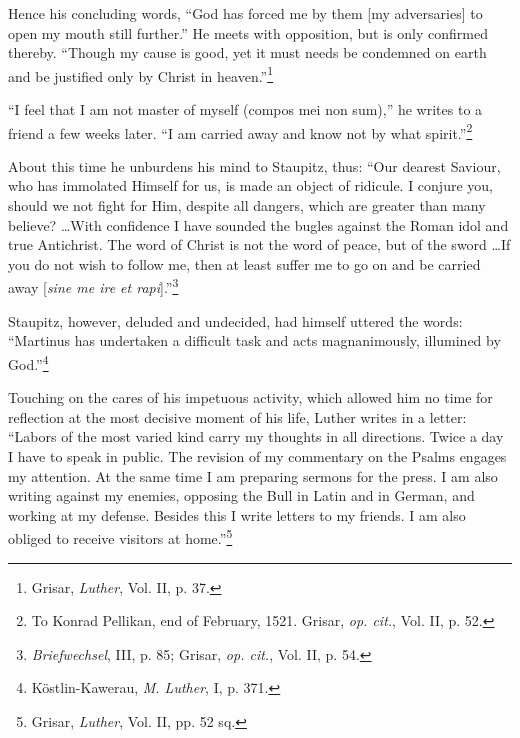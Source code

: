 Hence his concluding words, “God has forced me by them [my adversaries]
to open my mouth still further.” He meets with opposition, but is
only confirmed thereby. “Though my cause is good, yet it must needs be
condemned on earth and be justified only by Christ in heaven.”\footnote
{Grisar, \textit{Luther}, Vol. II, p. 37.}

“I feel that I am not master of myself (compos mei non sum),” he
writes to a friend a few weeks later. “I am carried away and know not by
what spirit.”\footnote
{To Konrad Pellikan, end of February, 1521. Grisar, \textit{op. cit.}, Vol. II, p. 52.}

About this time he unburdens his mind to Staupitz, thus: “Our dearest
Saviour, who has immolated Himself for us, is made an object of ridicule.
I conjure you, should we not fight for Him, despite all dangers, which are
greater than many believe? \dots With confidence I have sounded the bugles
against the Roman idol and true Antichrist. The word of Christ is not the
word of peace, but of the sword \dots If you do not wish to follow me, then
at least suffer me to go on and be carried away [\textit{sine me ire et rapi}].”\footnote
{\textit{Briefwechsel}, III, p. 85; Grisar, \textit{op. cit.}, Vol. II, p. 54.}

Staupitz, however, deluded and undecided, had himself uttered the words:
“Martinus has undertaken a difficult task and acts magnanimously, illumined
by God.”\footnote{Köstlin-Kawerau, \textit{M. Luther}, I, p. 371.}

Touching on the cares of his impetuous activity, which allowed him no
time for reflection at the most decisive moment of his life, Luther writes
in a letter: “Labors of the most varied kind carry my thoughts in all directions.
Twice a day I have to speak in public. The revision of my commentary
on the Psalms engages my attention. At the same time I am preparing sermons
for the press. I am also writing against my enemies, opposing the Bull
in Latin and in German, and working at my defense. Besides this I write
letters to my friends. I am also obliged to receive visitors at home.”\footnote
{Grisar, \textit{Luther}, Vol. II, pp. 52 sq.}

